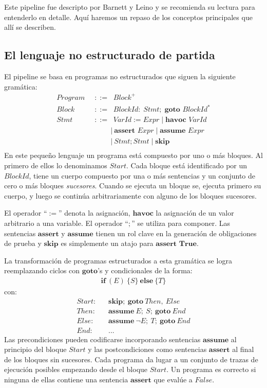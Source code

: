 \documentclass[12pt, a4paper, openany, fleqn]{book}
\begin{document}
    Este pipeline fue descripto por Barnett y Leino\cite{10.1145/1108792.1108813} y se recomienda su lectura para entenderlo en detalle. Aquí haremos un repaso de los conceptos principales que allí se describen.

    \subsection*{ El lenguaje no estructurado de partida}
    El pipeline se basa en programas no estructurados que siguen la siguiente gramática:
    \begin{align*}
        Program \;\;&::=\;\; Block^{+} \\
          Block \;\;&::=\;\; BlockId :\; Stmt;\;\textbf{goto } BlockId^{*} \\
           Stmt \;\;&::=\;\; VarId := Expr\;|\;\textbf{havoc } VarId \\
                &\;\;\;\;\;\;\;\;|\ \textbf{assert } Expr\;|\;\textbf{assume } Expr \\
                &\;\;\;\;\;\;\;\;|\ Stmt ; Stmt \;|\; \textbf{skip} \\
    \end{align*}
    En este pequeño lenguaje un programa está compuesto por uno o más bloques. Al primero de ellos lo denominamos $Start$. Cada bloque está identificado por un $BlockId$, tiene un cuerpo compuesto por una o más sentencias y un conjunto de cero o más bloques \textit{sucesores}. Cuando se ejecuta un bloque se, ejecuta primero su cuerpo, y luego se continúa arbitrariamente con alguno de los bloques sucesores. 

    El operador ``$:=$'' denota la asignación, $\textbf{havoc}$ la asignación de un valor arbitrario a una variable. El operador ``$;$'' se utiliza para componer. Las sentencias $\textbf{assert}$ y $\textbf{assume}$ tienen un rol clave en la generación de obligaciones de prueba y $\textbf{skip}$ es simplemente un atajo para $\textbf{assert True}$.

    La transformación de programas estructurados a esta gramática se logra reemplazando ciclos con $\textbf{goto}$'s y condicionales de la forma:
    \begin{align*}
        \textbf{if}\ (E)\ \{S\}\ \textbf{else}\ \{T\}
    \end{align*}
    con:
    \begin{align*}
        Start:&\;\;\;\textbf{skip};\ \textbf{goto}\ Then,\ Else \\
        Then:&\;\;\;\textbf{assume}\ E;\ S;\ \textbf{goto}\ End \\
        Else:&\;\;\;\textbf{assume}\ \lnot E;\ T;\ \textbf{goto}\ End \\
        End:&\;\;\;...
    \end{align*}
    Las precondiciones pueden codificarse incorporando sentencias $\textbf{assume}$ al principio del bloque $Start$ y las postcondiciones como sentencias $\textbf{assert}$ al final de los bloques sin sucesores.
    Cada programa da lugar a un conjunto de trazas de ejecución posibles empezando desde el bloque $Start$. Un programa es correcto si ninguna de ellas contiene una sentencia $\textbf{assert}$ que evalúe a $False$.
\end{document}
